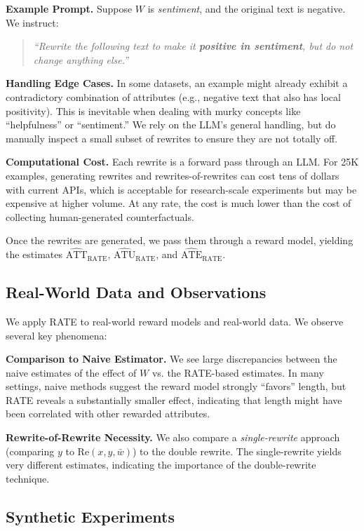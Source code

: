 \textbf{Example Prompt.} Suppose $W$ is \emph{sentiment}, and the original text is negative. We instruct:
\begin{quote}
\textit{``Rewrite the following text to make it \textbf{positive in sentiment}, but do not change anything else.''}
\end{quote}

\textbf{Handling Edge Cases.} In some datasets, an example might already exhibit a contradictory combination of attributes (e.g., negative text that also has local positivity). This is inevitable when dealing with murky concepts like ``helpfulness'' or ``sentiment.'' We rely on the LLM’s general handling, but do manually inspect a small subset of rewrites to ensure they are not totally off.

\textbf{Computational Cost.} Each rewrite is a forward pass through an LLM. For 25K examples, generating rewrites and rewrites-of-rewrites can cost tens of dollars with current APIs, which is acceptable for research-scale experiments but may be expensive at higher volume. At any rate, the cost is much lower than the cost of collecting human-generated counterfactuals.

Once the rewrites are generated, we pass them through a reward model, yielding the estimates $\widehat{\text{ATT}}_{\text{RATE}}$, $\widehat{\text{ATU}}_{\text{RATE}}$, and $\widehat{\text{ATE}}_{\text{RATE}}$.

\subsection{Real-World Data and Observations}

We apply RATE to real-world reward models and real-world data. We observe several key phenomena:

\textbf{Comparison to Naive Estimator.} We see large discrepancies between the naive estimates of the effect of $W$ vs. the RATE-based estimates. In many settings, naive methods suggest the reward model strongly ``favors'' length, but RATE reveals a substantially smaller effect, indicating that length might have been correlated with other rewarded attributes.

\textbf{Rewrite-of-Rewrite Necessity.} We also compare a \emph{single-rewrite} approach (comparing $y$ to $\text{Re}(x, y, \bar{w})$) to the double rewrite. The single-rewrite yields very different estimates, indicating the importance of the double-rewrite technique.

\subsection{Synthetic Experiments}

